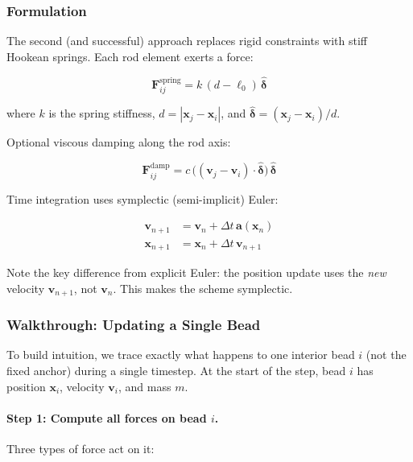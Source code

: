 \documentclass[11pt,a4paper]{article}
\begin{document}
\subsubsection{Formulation}

The second (and successful) approach replaces rigid constraints with stiff
Hookean springs. Each rod element exerts a force:

\begin{equation}
    \mathbf{F}_{ij}^{\text{spring}} = k \, (d - \ell_0) \, \hat{\boldsymbol{\delta}}
    \label{eq:spring}
\end{equation}

where $k$ is the spring stiffness, $d = |\mathbf{x}_j - \mathbf{x}_i|$,
and $\hat{\boldsymbol{\delta}} = (\mathbf{x}_j - \mathbf{x}_i)/d$.

Optional viscous damping along the rod axis:

\begin{equation}
    \mathbf{F}_{ij}^{\text{damp}} = c \,
    \bigl((\mathbf{v}_j - \mathbf{v}_i) \cdot \hat{\boldsymbol{\delta}}\bigr)
    \, \hat{\boldsymbol{\delta}}
    \label{eq:damping}
\end{equation}

Time integration uses symplectic (semi-implicit) Euler:

\begin{align}
    \mathbf{v}_{n+1} &= \mathbf{v}_n + \Delta t \, \mathbf{a}(\mathbf{x}_n)
    \label{eq:symp_v} \\
    \mathbf{x}_{n+1} &= \mathbf{x}_n + \Delta t \, \mathbf{v}_{n+1}
    \label{eq:symp_x}
\end{align}

Note the key difference from explicit Euler: the position update uses the
\emph{new} velocity $\mathbf{v}_{n+1}$, not $\mathbf{v}_n$. This makes the
scheme symplectic.

\subsubsection{Walkthrough: Updating a Single Bead}

To build intuition, we trace exactly what happens to one interior bead $i$
(not the fixed anchor) during a single timestep. At the start of the step,
bead $i$ has position $\mathbf{x}_i$, velocity $\mathbf{v}_i$, and mass $m$.

\paragraph{Step 1: Compute all forces on bead $i$.}
Three types of force act on it:
\end{document}
